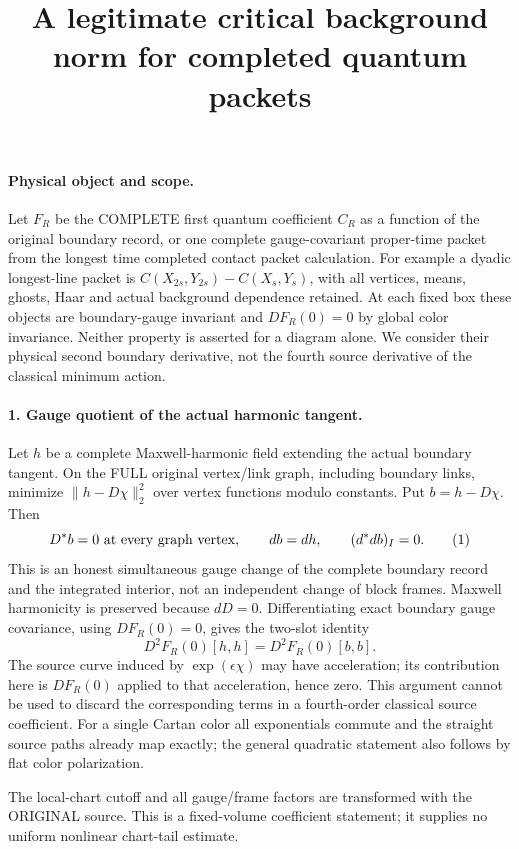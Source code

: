 \documentclass[11pt]{article}
\title{A legitimate critical background norm for completed quantum packets}\author{}\date{}
\begin{document}
\maketitle
\paragraph{Physical object and scope.}
Let $F_R$ be the COMPLETE first quantum coefficient $C_R$ as a function
of the original boundary record, or one complete gauge-covariant
proper-time packet from the longest time completed contact packet calculation. For example a dyadic longest-line packet is
$C(X_{2s},Y_{2s})-C(X_s,Y_s)$, with all vertices, means, ghosts,
Haar and actual background dependence retained. At each fixed box
these objects are boundary-gauge invariant and $DF_R(0)=0$ by global
color invariance. Neither property is asserted for a diagram alone.
We consider their physical second boundary derivative, not the fourth
source derivative of the classical minimum action.

\paragraph{1. Gauge quotient of the actual harmonic tangent.}
Let $h$ be a complete Maxwell-harmonic field extending the actual
boundary tangent. On the FULL original vertex/link graph, including
boundary links, minimize $\|h-D\chi\|_2^2$ over vertex functions
modulo constants. Put $b=h-D\chi$. Then
\[
 D^*b=0\ \hbox{at every graph vertex},\qquad db=dh,
 \qquad (d^*db)_I=0.                                        \tag{1}
\]
This is an honest simultaneous gauge change of the complete boundary
record and the integrated interior, not an independent change of block
frames. Maxwell harmonicity is preserved because $dD=0$.
Differentiating exact boundary gauge covariance, using $DF_R(0)=0$,
gives the two-slot identity
\[
 \boxed{D^2F_R(0)[h,h]=D^2F_R(0)[b,b].}                       \tag{2}
\]
The source curve induced by $\exp(\epsilon\chi)$ may have acceleration;
its contribution here is $DF_R(0)$ applied to that acceleration, hence
zero. This argument cannot be used to discard the corresponding terms
in a fourth-order classical source coefficient. For a single Cartan
color all exponentials commute and the straight source paths already
map exactly; the general quadratic statement also follows by flat
color polarization.

The local-chart cutoff and all gauge/frame factors are transformed
with the ORIGINAL source. This is a fixed-volume coefficient statement;
it supplies no uniform nonlinear chart-tail estimate.
\end{document}
